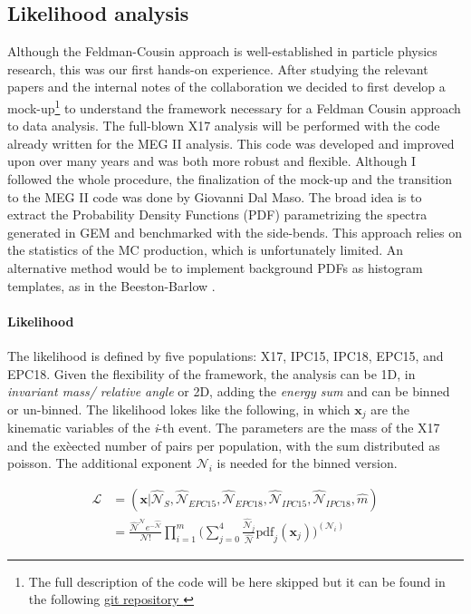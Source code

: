\begin{refsection}
    \subsection{Likelihood analysis}
    \label{sec:X17:likelihood}
        Although the Feldman-Cousin approach is well-established in particle physics research, this was our first hands-on experience. 
        After studying the relevant papers \cite{feldman:1998}\cite{feldman:2011} and the internal notes of the collaboration we decided to first develop a mock-up\footnote{The full description of the code will be here skipped but it can be found in the following         \href{https://github.com/gdalmaso96/X17_LL_mock_up}{\underline{git repository \faGithubSquare}}} to understand the framework necessary for a Feldman Cousin approach to data analysis.  
        The full-blown X17 analysis will be performed with the code already written for the MEG II analysis. 
        This code was developed and improved upon over many years and was both more robust and flexible. 
        Although I followed the whole procedure, the finalization of the mock-up and the transition to the MEG II code was done by Giovanni Dal Maso. 
        The broad idea is to extract the Probability Density Functions (PDF) parametrizing the spectra generated in GEM and benchmarked with the side-bends.
        This approach relies on the statistics of the MC production, which is unfortunately limited.
        An alternative method would be to implement background PDFs as histogram templates, as in the Beeston-Barlow \cite{X17:likelihood:BB}.

        \paragraph{Likelihood}
        The likelihood is defined by five populations: X17, IPC15, IPC18, EPC15, and EPC18.
        Given the flexibility of the framework, the analysis can be 1D, in \textit{invariant mass/ relative angle} or 2D, adding the \textit{energy sum} and can be binned or un-binned.
        The likelihood lokes like the following, in which $\textbf{x}_j$ are the kinematic variables of the \textit{i}-th event.
        The parameters are the mass of the X17 and the exèected number of pairs per population, with the sum distributed as poisson.
        The additional exponent $\mathcal{N}_i$ is needed for the binned version.
        
        \begin{align}
            \mathcal{L} &= (\textbf{x} | \hat{\mathcal{N}}_{S}, \hat{\mathcal{N}}_{EPC15}, \hat{\mathcal{N}}_{EPC18}, \hat{\mathcal{N}}_{IPC15}, \hat{\mathcal{N}}_{IPC18}, \hat{m}) \\
            &= \frac{\hat{\mathcal{N}}^\mathcal{N} e^{-\hat{\mathcal{N}}} }{\mathcal{N}!}  \prod_{i=1}^{m} \Big( \sum_{j=0}^{4} \frac{\hat{\mathcal{N}}_{j}}{\hat{\mathcal{N}}} \text{pdf}_j(\textbf{x}_j)\Big)^{(\mathcal{N}_i)}
        \end{align}


\end{refsection}

